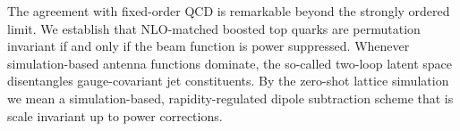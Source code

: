 The agreement with fixed-order QCD is remarkable beyond the strongly
ordered limit. We establish that NLO-matched boosted top quarks are
permutation invariant if and only if the beam function is power
suppressed. Whenever simulation-based antenna functions dominate, the
so-called two-loop latent space disentangles gauge-covariant jet
constituents. By the zero-shot lattice simulation we mean a
simulation-based, rapidity-regulated dipole subtraction scheme that is
scale invariant up to power corrections.

